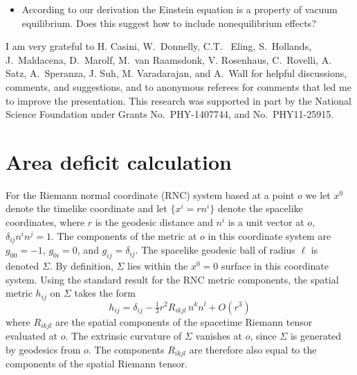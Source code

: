 \documentclass[aps,prd,showpacs,groupedaddress,nofootinbib,longbibliography,12pt]{revtex4-1}
\def\beq{\begin{equation}}
\def\eeq{\end{equation}}
\def\d{\delta}\def\D{\Delta}
\begin{document}
\begin{itemize}

\item According to our derivation the Einstein equation is a property of vacuum equilibrium. 
Does this suggest how to include nonequilibrium effects? 

\end{itemize}

\vspace{3mm}
\acknowledgments

I am very grateful to H. Casini, W.~Donnelly, C.T.~ Eling, S.~Hollands, J.~Maldacena, D.~Marolf, M.~van Raamsdonk, V. Rosenhaus, C.~Rovelli, A. Satz, A.~Speranza, J. Suh, M. Varadarajan, and A.~Wall for helpful discussions, comments, and suggestions, and to anonymous referees for comments that led me to improve the presentation. This research was supported in part by the National Science Foundation under Grants No.\ PHY-1407744, and No.\ PHY11-25915.

\appendix

\section{Area deficit calculation}
\label{AppA}


For the Riemann normal coordinate (RNC) system based at a point $o$
we let $x^0$ denote the timelike coordinate and let $\{x^i=r n^i\}$ denote the 
spacelike coordinates, where $r$ is the geodesic distance and $n^i$ is a unit vector at $o$, 
$\d_{ij}n^i n^j=1$. The components of the metric at $o$ in this coordinate system are
$g_{00}=-1$, $g_{0i}=0$, and $g_{ij}=\d_{ij}$.  The spacelike geodesic ball of radius 
$\ell$ is denoted $\Sigma$. 
By definition, $\Sigma$ lies within the $x^0=0$ surface in this coordinate system. 
Using the standard result for the RNC metric components, 
the spatial metric $h_{ij}$ on $\Sigma$ takes the form 
%
\beq\label{metric}
h_{ij} = \d_{ij} -\tfrac{1}{3} r^2 R_{ikjl}\,n^k n^l + O(r^3)
\eeq
%
where $R_{ikjl}$ are the spatial components of the spacetime Riemann tensor evaluated at $o$.
The extrinsic curvature of $\Sigma$ vanishes at $o$, 
since $\Sigma$ is generated by geodesics from $o$. The components $R_{ikjl}$ are therefore 
also equal to the components of the spatial Riemann tensor. 
\end{document}

